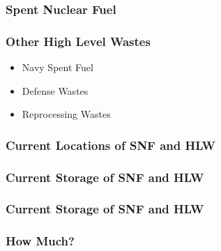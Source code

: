 
\begin{frame}
  \frametitle{Spent Nuclear Fuel}
  
\end{frame}

\begin{frame}
  \frametitle{Other High Level Wastes}
  \begin{itemize}
    \item Navy Spent Fuel
    \item Defense Wastes
    \item Reprocessing Wastes
  \end{itemize}
\end{frame}

\begin{frame}
  \frametitle{Current Locations of SNF and HLW}
  
\end{frame}

\begin{frame}
  \frametitle{Current Storage of SNF and HLW}
  
\end{frame}

\begin{frame}
  \frametitle{Current Storage of SNF and HLW}
  
\end{frame}

\begin{frame}
  \frametitle{How Much?}
  
\end{frame}

